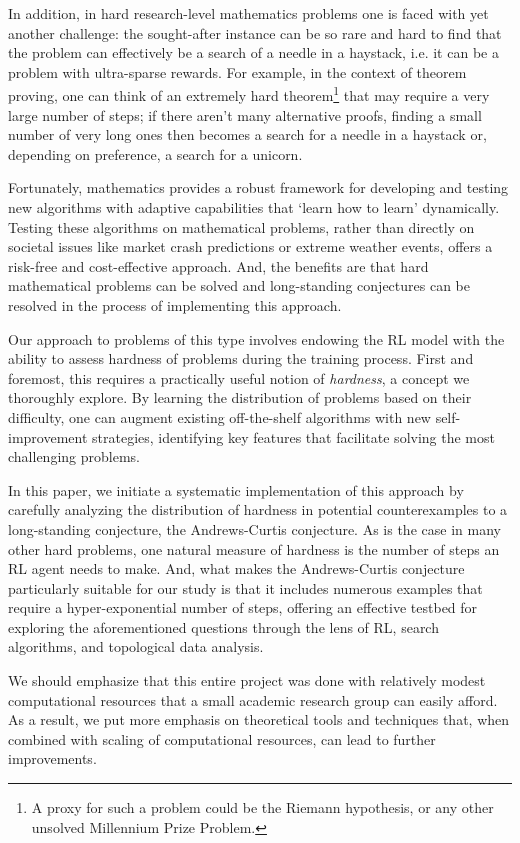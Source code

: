 In addition, in hard research-level mathematics problems one is faced with yet another challenge: the sought-after instance can be so rare and hard to find that the problem can effectively be a search of a needle in a haystack, i.e. it can be a problem with ultra-sparse rewards. For example, in the context of theorem proving, one can think of an extremely hard theorem\footnote{A proxy for such a problem could be the Riemann hypothesis, or any other unsolved Millennium Prize Problem.} that may require a very large number of steps; if there aren't many alternative proofs, finding a small number of very long ones then becomes a search for a needle in a haystack or, depending on preference, a search for a unicorn.

Fortunately, mathematics provides a robust framework for developing and testing new algorithms with adaptive capabilities that `learn how to learn' dynamically. Testing these algorithms on mathematical problems, rather than directly on societal issues like market crash predictions or extreme weather events, offers a risk-free and cost-effective approach. And, the benefits are that hard mathematical problems can be solved and long-standing conjectures can be resolved in the process of implementing this approach.

Our approach to problems of this type involves endowing the RL model with the ability to assess hardness of problems during the training process. First and foremost, this requires a practically useful notion of {\it hardness}, a concept we thoroughly explore. By learning the distribution of problems based on their difficulty, one can augment existing off-the-shelf algorithms with new self-improvement strategies, identifying key features that facilitate solving the most challenging problems.

In this paper, we initiate a systematic implementation of this approach by carefully analyzing the distribution of hardness in potential counterexamples to a long-standing conjecture, the Andrews-Curtis conjecture. As is the case in many other hard problems, one natural measure of hardness is the number of steps an RL agent needs to make. And, what makes the Andrews-Curtis conjecture particularly suitable for our study is that it includes numerous examples that require a hyper-exponential number of steps, offering an effective testbed for exploring the aforementioned questions through the lens of RL, search algorithms, and topological data analysis.

We should emphasize that this entire project was done with relatively modest computational resources that a small academic research group can easily afford. As a result, we put more emphasis on theoretical tools and techniques that, when combined with scaling of computational resources, can lead to further improvements.

